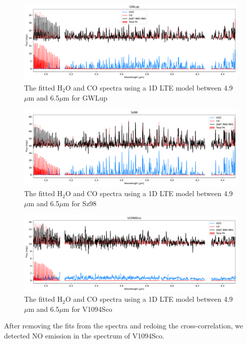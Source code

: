 \documentclass[oneside, single, authoryear, semicolon]{lion-msc}
\newcommand{\4}{$_4$}
\newcommand{\3}{$_3$}
\newcommand{\2}{$_2$}
\begin{document}
\begin{figure}[!ht]
    \centering
    \includegraphics[width=\linewidth]{Figures/Fit_GWLup.pdf}
    \caption{The fitted H\2O and CO spectra using a 1D LTE model between 4.9 $\mu$m and 6.5$\mu$m for GWLup}
    \label{fig: fit gwlup}
\end{figure}
\begin{figure}[!ht]
    \centering
    \includegraphics[width=\linewidth]{Figures/Fit_Sz98.pdf}
    \caption{The fitted H\2O and CO spectra using a 1D LTE model between 4.9 $\mu$m and 6.5$\mu$m for Sz98}
    \label{fig: fit sz98}
\end{figure}
\begin{figure}[!ht]
    \centering
    \includegraphics[width=\linewidth]{Figures/Fit_V1094Sco.pdf}
    \caption{The fitted H\2O and CO spectra using a 1D LTE model between 4.9 $\mu$m and 6.5$\mu$m for V1094Sco}
    \label{fig: v1094sco}
\end{figure}

After removing the fits from the spectra and redoing the cross-correlation, we detected NO emission in the spectrum of V1094Sco.
\end{document}
